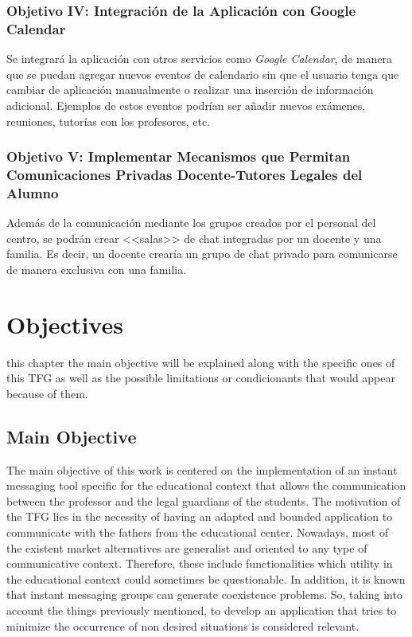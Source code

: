 \subsection{Objetivo IV: Integración de la Aplicación con Google Calendar}
Se integrará la aplicación con otros servicios como \textit{Google Calendar}, de manera que se puedan agregar nuevos eventos de calendario sin que el usuario tenga que cambiar de aplicación manualmente o realizar una inserción de información adicional. Ejemplos de estos eventos podrían ser añadir nuevos exámenes, reuniones, tutorías con los profesores, etc.

\subsection{Objetivo V: Implementar Mecanismos que Permitan Comunicaciones Privadas Docente-Tutores Legales del Alumno}
Además de la comunicación mediante los grupos creados por el personal del centro, se podrán crear <<salas>> de chat integradas por un docente y una familia. Es decir, un docente crearía un grupo de chat privado para comunicarse de manera exclusiva con una familia.

\setcounter{chapter}{1}

\chapter{Objectives}
 this chapter the main objective will be explained along with the specific ones of this \acs{TFG} as well as the possible limitations or condicionants that would appear because of them.

\section{Main Objective}
The main objective of this work is centered on the implementation of an instant messaging tool specific for the educational context that allows the communication between the \mbox{professor} and the legal guardians of the students. The motivation of the \acs{TFG} lies in the \mbox{necessity} of having an adapted and bounded application to communicate with the fathers from the \mbox{educational} center. Nowadays, most of the existent market alternatives are \mbox{generalist} and oriented to any type of communicative context. Therefore, these include functionalities which utility in the educational context could sometimes be questionable. In addition, it is known that \mbox{instant} messaging groups can generate coexistence problems. So, taking into \mbox{account} the things \mbox{previously} mentioned, to develop an application that tries to minimize the occurrence of non desired situations is considered relevant.

